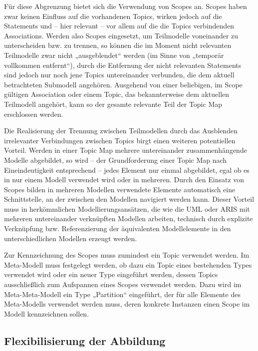 Für diese Abgrenzung bietet sich die Verwendung von Scopes an. Scopes haben zwar keinen Einfluss auf die vorhandenen Topics, wirken jedoch auf die Statements und -- hier relevant -- vor allem auf die die Topics verbindenden Associations. Werden also Scopes eingesetzt, um Teilmodelle voneinander zu unterscheiden bzw. zu trennen, so können die im Moment nicht relevanten Teilmodelle zwar nicht „ausgeblendet“ werden (im Sinne von „temporär vollkommen entfernt“), durch die Entfernung der nicht relevanten Statements sind jedoch nur noch jene Topics untereinander verbunden, die dem aktuell betrachteten Submodell angehören. Ausgehend von einer beliebigen, im Scope gültigen Association oder einem Topic, das bekannterweise dem aktuellen Teilmodell angehört, kann so der gesamte relevante Teil der Topic Map erschlossen werden.

Die Realisierung der Trennung zwischen Teilmodellen durch das Ausblenden irrelevanter Verbindungen zwischen Topics birgt einen weiteren potentiellen Vorteil. Werden in einer Topic Map mehrere untereinander zusammenhängende Modelle abgebildet, so wird -- der Grundforderung einer Topic Map nach Eineindeutigkeit entsprechend -- jedes Element nur einmal abgebildet, egal ob es in nur einem Modell verwendet wird oder in mehreren. Durch den Einsatz von Scopes bilden in mehreren Modellen verwendete Elemente automatisch eine Schnittstelle, an der zwischen den Modellen navigiert werden kann. Dieser Vorteil muss in herkömmlichen Modellierungsansätzen, die wie die \gls{UML} \citep{Rumbaugh04} oder ARIS \citep{Scheer03} mit mehreren untereinander verknüpften Modellen arbeiten, technisch durch explizite Verknüpfung bzw. Referenzierung der äquivalenten Modellelemente in den unterschiedlichen Modellen erzeugt werden. 

Zur Kennzeichnung des Scopes muss zumindest ein Topic verwendet werden. Im Meta-Modell muss festgelegt werden, ob dazu ein Topic eines bestehenden Types verwendet wird oder ein neuer Type eingeführt werden, dessen Topics ausschließlich zum Aufspannen eines Scopes verwendet werden. Dazu wird im Meta-Meta-Modell ein Type „Partition“ eingeführt, der für alle Elemente des Meta-Modells verwendet werden muss, deren konkrete Instanzen einen Scope im Modell kennzeichnen sollen.


\subsection{Flexibilisierung der Abbildung}
\label{sub:flexibilisierung_der_abbildung}

